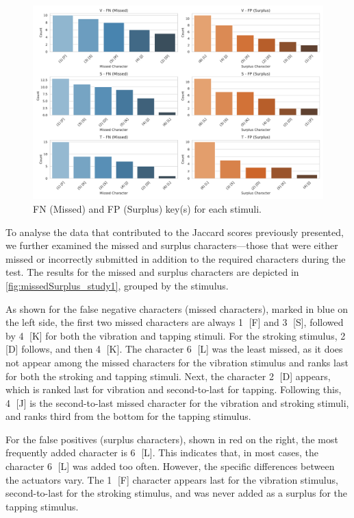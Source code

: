 \begin{figure}
    \centering
    \includegraphics[width=\linewidth]{src/pictures/Study1Data_Experiment/columnChart.pdf}
    \caption{FN  (Missed) and FP (Surplus) key(s) for each stimuli.}
    \label{fig:missedSurplus_study1}
\end{figure}

To analyse the data that contributed to the Jaccard scores previously presented, we further examined the missed and surplus characters—those that were either missed or incorrectly submitted in addition to the required characters during the test. 
The results for the missed and surplus characters are depicted in \autoref{fig:missedSurplus_study1}, grouped by the stimulus.

As shown for the false negative characters (missed characters), marked in blue on the left side, the first two missed characters are always \textcircled{1} [F] and \textcircled{3} [S], followed by \textcircled{4} [K] for both the vibration and tapping stimuli. 
For the stroking stimulus, \textcircled{2} [D] follows, and then \textcircled{4} [K]. 
The character \textcircled{6} [L] was the least missed, as it does not appear among the missed characters for the vibration stimulus and ranks last for both the stroking and tapping stimuli. 
Next, the character \textcircled{2} [D] appears, which is ranked last for vibration and second-to-last for tapping. 
Following this, \textcircled{4} [J] is the second-to-last missed character for the vibration and stroking stimuli, and ranks third from the bottom for the tapping stimulus.

For the false positives (surplus characters), shown in red on the right, the most frequently added character is \textcircled{6} [L]. 
This indicates that, in most cases, the character \textcircled{6} [L] was added too often. However, the specific differences between the actuators vary. 
The \textcircled{1} [F] character appears last for the vibration stimulus, second-to-last for the stroking stimulus, and was never added as a surplus for the tapping stimulus.


